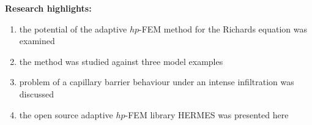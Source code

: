 \documentclass{article}[12pt]
\begin{document}
{\LARGE \bf Research highlights:}

\bigskip

\begin{enumerate}
\item the potential of the adaptive $hp$-FEM method for the Richards equation was examined
\item the method was studied against three model examples 
\item problem of a capillary barrier behaviour under an intense infiltration was discussed
\item the open source adaptive $hp$-FEM library HERMES was presented here
\end{enumerate}
\end{document}
